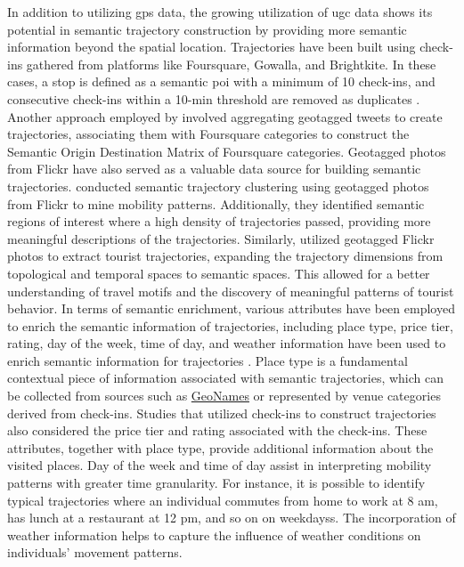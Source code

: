 \documentclass{article}
\theoremstyle{remark}
\begin{document}
In addition to utilizing \acrshort{gps} data, the growing utilization of \acrshort{ugc} data shows its potential in semantic trajectory construction by providing more semantic information beyond the spatial location. Trajectories have been built using check-ins gathered from platforms like Foursquare, Gowalla, and Brightkite. In these cases, a stop is defined as a semantic \acrshort{poi} with a minimum of 10 check-ins, and consecutive check-ins within a 10-min threshold are removed as duplicates \citep{petry_towards_2019,ferrero_mastermovelets_2020}. Another approach employed by \cite{nin_tweets_2014} involved aggregating geotagged tweets to create trajectories, associating them with Foursquare categories to construct the Semantic Origin Destination Matrix of Foursquare categories. Geotagged photos from Flickr have also served as a valuable data source for building semantic trajectories. \cite{cai_mining_2018} conducted semantic trajectory clustering using geotagged photos from Flickr to mine mobility patterns. Additionally, they identified semantic regions of interest where a high density of trajectories passed, providing more meaningful descriptions of the trajectories. Similarly, \cite{yang_quantifying_2017} utilized geotagged Flickr photos to extract tourist trajectories, expanding the trajectory dimensions from topological and temporal spaces to semantic spaces. This allowed for a better understanding of travel motifs and the discovery of meaningful patterns of tourist behavior. In terms of semantic enrichment, various attributes have been employed to enrich the semantic information of trajectories, including place type, price tier, rating, day of the week, time of day, and weather information have been used to enrich semantic information for trajectories \cite{cai_mining_2018,petry_towards_2019,liu_stccd_2020,ferrero_mastermovelets_2020}. Place type is a fundamental contextual piece of information associated with semantic trajectories, which can be collected from sources such as \href{http://www.geonames.org/}{GeoNames} or represented by venue categories derived from check-ins. Studies that utilized check-ins to construct trajectories also considered the price tier and rating associated with the check-ins. These attributes, together with place type, provide additional information about the visited places. Day of the week and time of day assist in interpreting mobility patterns with greater time granularity. For instance, it is possible to identify typical trajectories where an individual commutes from home to work at 8 am, has lunch at a restaurant at 12 pm, and so on on weekdayss. The incorporation of weather information helps to capture the influence of weather conditions on individuals' movement patterns.
\end{document}
